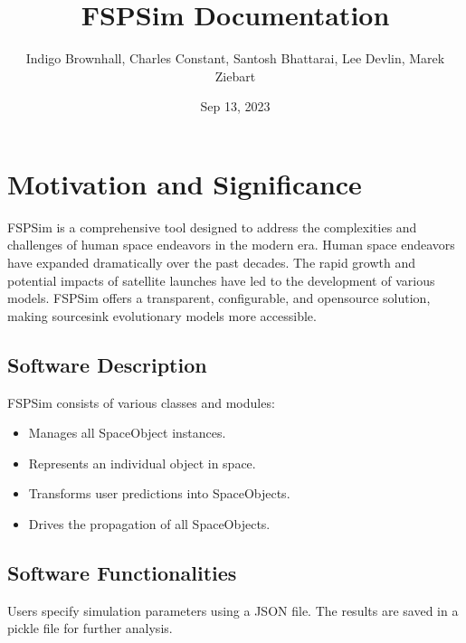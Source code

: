 \documentclass[letterpaper,10pt,english]{sphinxmanual}
\title{FSPSim Documentation}
\date{Sep 13, 2023}
\author{Indigo Brownhall, 
Charles Constant, 
Santosh Bhattarai, 
Lee Devlin, 
Marek Ziebart}
\begin{document}
\pagestyle{empty}
\sphinxmaketitle
\pagestyle{plain}
\sphinxtableofcontents
\pagestyle{normal}
\label{\detokenize{index::doc}}



\chapter{Motivation and Significance}
\label{\detokenize{index:motivation-and-significance}}
\sphinxAtStartPar
FSPSim is a comprehensive tool designed to address the complexities and challenges of human space endeavors in the modern era.
Human space endeavors have expanded dramatically over the past decades. The rapid growth and potential impacts of satellite launches have led to the development of various models. FSPSim offers a transparent, configurable, and open\sphinxhyphen{}source solution, making source\sphinxhyphen{}sink evolutionary models more accessible.

\begin{figure}[htbp]
\centering

\noindent{}
\end{figure}


\section{Software Description}
\label{\detokenize{index:software-description}}
\sphinxAtStartPar
FSPSim consists of various classes and modules:
\begin{itemize}
\item {} 
\sphinxAtStartPar
{} Manages all SpaceObject instances.

\item {} 
\sphinxAtStartPar
{} Represents an individual object in space.

\item {} 
\sphinxAtStartPar
{} Transforms user predictions into SpaceObjects.

\item {} 
\sphinxAtStartPar
{} Drives the propagation of all SpaceObjects.

\end{itemize}


\section{Software Functionalities}
\label{\detokenize{index:software-functionalities}}
\sphinxAtStartPar
Users specify simulation parameters using a JSON file. The results are saved in a pickle file for further analysis.
\end{document}
